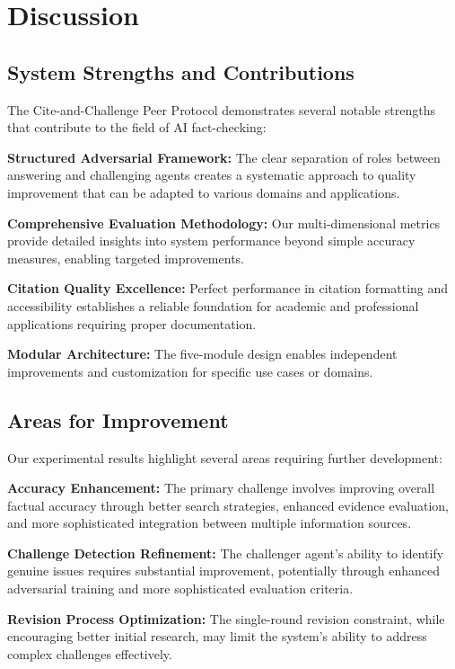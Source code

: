 \documentclass[11pt,a4paper]{article}
\begin{document}
\section{Discussion}

\subsection{System Strengths and Contributions}

The Cite-and-Challenge Peer Protocol demonstrates several notable strengths that contribute to the field of AI fact-checking:

\textbf{Structured Adversarial Framework:} The clear separation of roles between answering and challenging agents creates a systematic approach to quality improvement that can be adapted to various domains and applications.

\textbf{Comprehensive Evaluation Methodology:} Our multi-dimensional metrics provide detailed insights into system performance beyond simple accuracy measures, enabling targeted improvements.

\textbf{Citation Quality Excellence:} Perfect performance in citation formatting and accessibility establishes a reliable foundation for academic and professional applications requiring proper documentation.

\textbf{Modular Architecture:} The five-module design enables independent improvements and customization for specific use cases or domains.

\subsection{Areas for Improvement}

Our experimental results highlight several areas requiring further development:

\textbf{Accuracy Enhancement:} The primary challenge involves improving overall factual accuracy through better search strategies, enhanced evidence evaluation, and more sophisticated integration between multiple information sources.

\textbf{Challenge Detection Refinement:} The challenger agent's ability to identify genuine issues requires substantial improvement, potentially through enhanced adversarial training and more sophisticated evaluation criteria.

\textbf{Revision Process Optimization:} The single-round revision constraint, while encouraging better initial research, may limit the system's ability to address complex challenges effectively.
\end{document}
